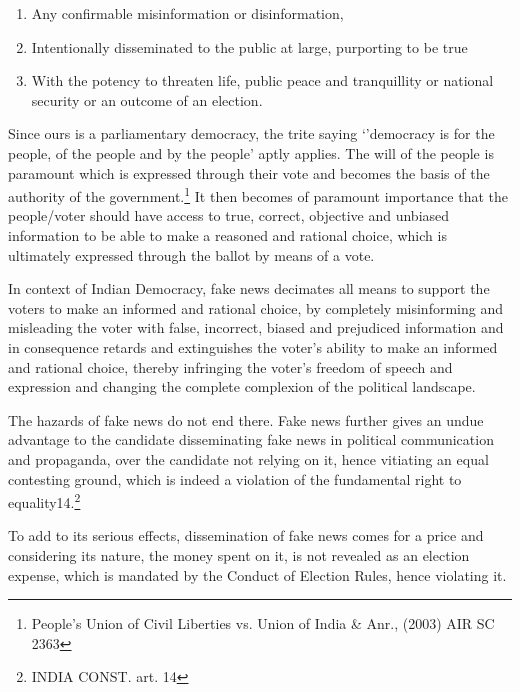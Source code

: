 \begin{multicols}{2}
\begin{enumerate}
\itemsep=0pt
\item Any confirmable misinformation or disinformation, 

\item Intentionally disseminated to the public at large, purporting to be true 

\item With the potency to threaten life, public peace and tranquillity or national security or
an outcome of an election.
\end{enumerate}

\vspace{-.3cm}


\vspace{-.15cm}

\noi
Since ours is a parliamentary democracy, the trite saying ‘’democracy is for the people, of the
people and by the people’ aptly applies. The will of the people is paramount which is
expressed through their vote and becomes the basis of the authority of the 
government.\footnote{People's Union of Civil Liberties vs. Union of India \& Anr., (2003) AIR SC 2363} It
then becomes of paramount importance that the people/voter should have access to true,
correct, objective and unbiased information to be able to make a reasoned and rational choice,
which is ultimately expressed through the ballot by means of a vote.

\noi
In context of Indian Democracy, fake news decimates all means to support the voters to make
an informed and rational choice, by completely misinforming and misleading the voter with
false, incorrect, biased and prejudiced information and in consequence retards and
extinguishes the voter’s ability to make an informed and rational choice, thereby infringing
the voter’s freedom of speech and expression and changing the complete complexion of the
political landscape.

\noi
The hazards of fake news do not end there. Fake news further gives an undue advantage to
the candidate disseminating fake news in political communication and propaganda, over the 
candidate not relying on it, hence vitiating an equal contesting ground, which is indeed a
violation of the fundamental right to equality14.\footnote{INDIA CONST. art. 14} 

\noi
To add to its serious effects, dissemination of fake news comes for a price and considering its
nature, the money spent on it, is not revealed as an election expense, which is mandated by
the Conduct of Election Rules, hence violating it.


\end{multicols}

